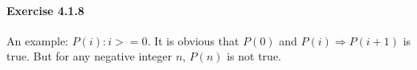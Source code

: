 \paragraph{Exercise 4.1.8} \label{exercise4.1.8}
An example: $P(i): i>=0$. It is obvious that $P(0)$ and $P(i) \Longrightarrow P(i+1)$ is true. But for any  
negative integer $n$, $P(n)$ is not true.